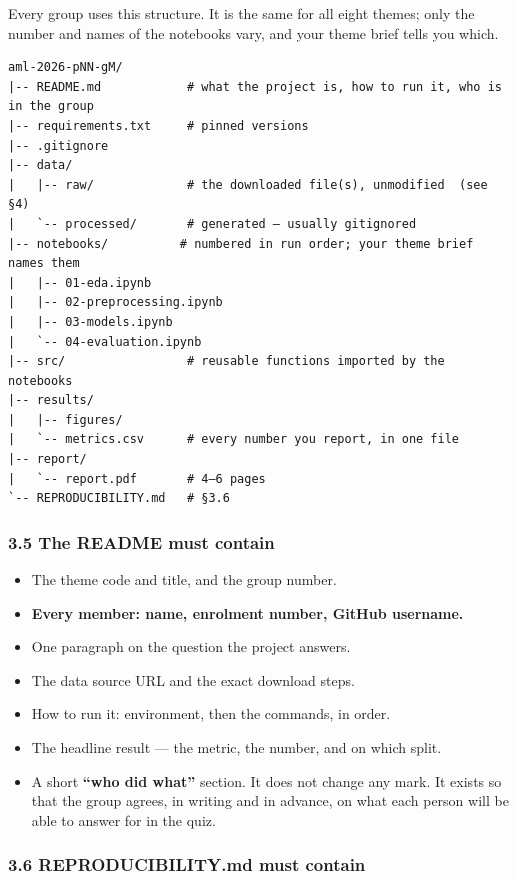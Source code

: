 \documentclass[11pt]{article}
\providecommand{\tightlist}{\setlength{\itemsep}{0pt}\setlength{\parskip}{0pt}}
\begin{document}
Every group uses this structure. It is the same for all eight themes; only the
number and names of the notebooks vary, and your theme brief tells you which.

\begin{verbatim}
aml-2026-pNN-gM/
|-- README.md            # what the project is, how to run it, who is in the group
|-- requirements.txt     # pinned versions
|-- .gitignore
|-- data/
|   |-- raw/             # the downloaded file(s), unmodified  (see §4)
|   `-- processed/       # generated — usually gitignored
|-- notebooks/          # numbered in run order; your theme brief names them
|   |-- 01-eda.ipynb
|   |-- 02-preprocessing.ipynb
|   |-- 03-models.ipynb
|   `-- 04-evaluation.ipynb
|-- src/                 # reusable functions imported by the notebooks
|-- results/
|   |-- figures/
|   `-- metrics.csv      # every number you report, in one file
|-- report/
|   `-- report.pdf       # 4–6 pages
`-- REPRODUCIBILITY.md   # §3.6
\end{verbatim}

\hypertarget{the-readme-must-contain}{%
\subsubsection{3.5 The README must contain}\label{the-readme-must-contain}}

\begin{itemize}
\tightlist
\item
  The theme code and title, and the group number.
\item
  \textbf{Every member: name, enrolment number, GitHub username.}
\item
  One paragraph on the question the project answers.
\item
  The data source URL and the exact download steps.
\item
  How to run it: environment, then the commands, in order.
\item
  The headline result --- the metric, the number, and on which split.
\item
  A short \textbf{``who did what''} section. It does not change any mark. It exists so
  that the group agrees, in writing and in advance, on what each person will be
  able to answer for in the quiz.
\end{itemize}

\hypertarget{reproducibility.md-must-contain}{%
\subsubsection{3.6 REPRODUCIBILITY.md must contain}\label{reproducibility.md-must-contain}}
\end{document}
